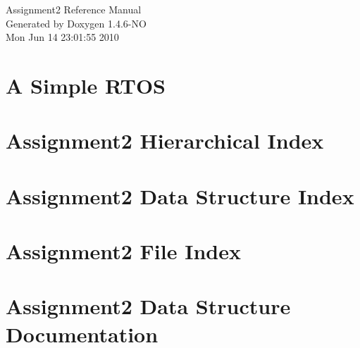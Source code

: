 \documentclass[a4paper]{book}
\begin{document}
\begin{titlepage}
\vspace*{7cm}
\begin{center}
{\Large Assignment2 Reference Manual}\\
\vspace*{1cm}
{\large Generated by Doxygen 1.4.6-NO}\\
\vspace*{0.5cm}
{\small Mon Jun 14 23:01:55 2010}\\
\end{center}
\end{titlepage}
\clearemptydoublepage
{}
\tableofcontents
\clearemptydoublepage
{}
\chapter{A Simple RTOS }
\label{index}
\chapter{Assignment2 Hierarchical Index}

\chapter{Assignment2 Data Structure Index}

\chapter{Assignment2 File Index}

\chapter{Assignment2 Data Structure Documentation}













\end{document}

